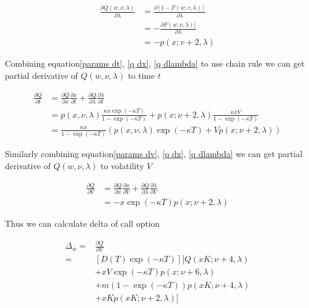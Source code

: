 \begin{equation}\label{q dlambda}
    \begin{aligned}
        \frac{\partial Q(w, \nu, \lambda)}{\partial \lambda}&=\frac{\partial[1-F(w ; v, \lambda)]}{\partial \lambda}\\
        &=-\frac{\partial F(w ; \nu, \lambda)]}{\partial \lambda} \\
        &=-p(x ; v+2, \lambda)
    \end{aligned}
\end{equation}

Combining equation\eqref{params dt}, \eqref{q dx}, \eqref{q dlambda} to use chain rule we can get partial derivative of $Q(w, \nu, \lambda)$ to time $t$

\begin{equation}\label{q dt}
    \begin{aligned}
        \frac{\partial Q}{\partial t}&= \frac{\partial Q}{\partial x}\frac{\partial x}{\partial t} + \frac{\partial Q}{\partial \lambda} \frac{\partial \lambda}{\partial t} \\
        &= p(x, \nu, \lambda) \frac{\kappa x \exp(- \kappa T)}{1 - \exp(- \kappa T)} + p(x ; \nu+2, \lambda) \frac{\kappa x V }{1 - \exp(- \kappa T)} \\
        &= \frac{\kappa x }{1 - \exp(- \kappa T)} \left(p(x, \nu, \lambda) \exp(- \kappa T) + V p(x ; \nu+2, \lambda)\right)
    \end{aligned}
\end{equation}

Similarly combining equation\eqref{params dv}, \eqref{q dx}, \eqref{q dlambda} we can get partial derivative of $Q(w, \nu, \lambda)$ to volatility $V$

\begin{equation}\label{q dv}
    \begin{aligned}
        \frac{\partial Q}{\partial V}&= \frac{\partial Q}{\partial x}\frac{\partial x}{\partial V} + \frac{\partial Q}{\partial \lambda} \frac{\partial \lambda}{\partial V} \\
        &= - x \exp (-\kappa T) p(x ; \nu+2, \lambda)
    \end{aligned}
\end{equation}

Thus we can calculate delta of call option

\begin{equation}
    \begin{aligned}
        \Delta_{\bar{w}}= &\frac{\partial Q}{\partial V} \\
        =& [D(T) \exp (-\kappa T)] [Q(x K; \nu+4, \lambda) \\
        &+xV \exp (-\kappa T) p(x; \nu+6, \lambda) \\
        &+m (1-\exp (-\kappa T)) p(xK; \nu+4, \lambda) \\
        &+ xK p(x K; \nu+2, \lambda)]
        \end{aligned}
\end{equation}

